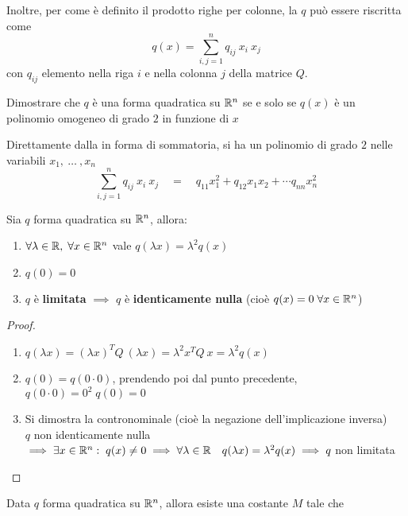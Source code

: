 \begin{appendices}
\begin{definition}
	\noindent Inoltre, per come è definito il prodotto righe per colonne, la $q$ può essere riscritta come
	\[q(x) = \sum\limits_{i, j = 1}^{n} q_{ij}\:x_i\:x_j\]
	con $q_{ij}$ elemento nella riga $i$ e nella colonna $j$ della matrice $Q$.
\end{definition}
\begin{exercise}
	Dimostrare che $q$ è una forma quadratica su $\mathbb{R}^n$ se e solo se $q(x)$ è un polinomio omogeneo di grado $2$ in funzione di $x$
	\begin{solution}
		Direttamente dalla  in forma di sommatoria, si ha un polinomio di grado $2$ nelle variabili $x_1, \:\dotsc\:, x_n$
		\[\sum\limits_{i, j = 1}^{n} q_{ij}\:x_i\:x_j \quad = \quad q_{11}x_1^2 + q_{12}x_1x_2 + \cdots q_{nn}x_n^2\]
	\end{solution}
\end{exercise}
\begin{proposition}
	\label{prop:proprieta_form_quadr}
	Sia $q$ forma quadratica su $\mathbb{R}^n$, allora:
	\begin{enumerate}
		\item \label{itm:form_quadr_lambda} $\forall \lambda \in \mathbb{R},\; \forall x \in \mathbb{R}^n$ vale $q(\lambda x) = \lambda^2 q(x)$
		\item $q(0) = 0$
		\item $q$ è \textbf{limitata} $\implies$ $q$ è \textbf{identicamente nulla} (cioè $q(x) = 0 \; \forall x \in \mathbb{R}^n$)
	\end{enumerate}
	\begin{proof}\hfill
		\begin{enumerate}
			\item $q(\lambda x) = (\lambda x)^T Q \: (\lambda x) = \lambda^2 x^T Q \: x = \lambda^2 q(x)$
			\item $q(0) = q(0 \cdot 0)$, prendendo poi dal punto precedente, $q(0 \cdot 0) = 0^2 \; q(0) = 0$
			\item Si dimostra la contronominale (cioè la negazione dell'implicazione inversa)\\
				$q$ non identicamente nulla
				$\implies \exists x \in \mathbb{R}^n:\; q(x) \neq 0 \implies \forall \lambda \in \mathbb{R} \quad q(\lambda x) = \lambda^2 q(x) \implies q$ non limitata
		\end{enumerate}
	\end{proof}
\end{proposition}
\begin{proposition}
	\label{prop:form_quadr_M}
	Data $q$ forma quadratica su $\mathbb{R}^n$, allora esiste una costante $M$ tale che

\end{proposition}
\end{appendices}
